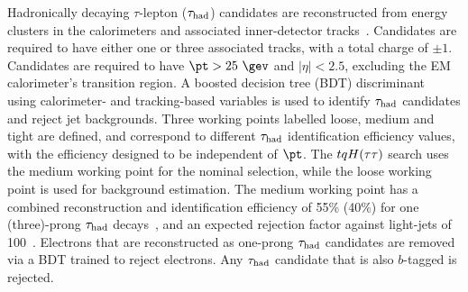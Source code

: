 Hadronically decaying $\tau$-lepton ($\tau_{\mathrm{had}}$) candidates are reconstructed from energy clusters in the calorimeters and
associated inner-detector tracks~\cite{ATL-PHYS-PUB-2015-045}. Candidates are required to have either one or three associated tracks,
with a total charge of $\pm 1$. Candidates are required to have $\pt > 25~\gev$ and $|\eta|<2.5$, excluding the EM calorimeter's transition region.
A boosted decision tree (BDT) discriminant~\cite{Breiman:1984jka,Friedman:2002we,Freund:1997xna} using calorimeter- and tracking-based variables is used to identify $\tau_{\mathrm{had}}$ candidates and reject
jet backgrounds. Three working points labelled loose, medium and tight are defined, and correspond to different $\tau_{\mathrm{had}}$ identification efficiency 
values, with the efficiency designed to be independent of $\pt$. The $tqH(\tau\tau)$ search uses the medium
working point for the nominal selection, while the loose working point is used for background estimation.
The medium working point has a combined reconstruction and identification efficiency of 55\% (40\%) for one (three)-prong $\tau_{\mathrm{had}}$ 
decays~\cite{ATLAS-CONF-2017-029}, and an expected rejection factor against light-jets of 100~\cite{ATL-PHYS-PUB-2015-045}. 
Electrons that are reconstructed as one-prong $\tau_{\mathrm{had}}$ candidates are removed via a BDT trained to reject electrons.
Any $\tau_{\mathrm{had}}$ candidate that is also $b$-tagged is rejected.



